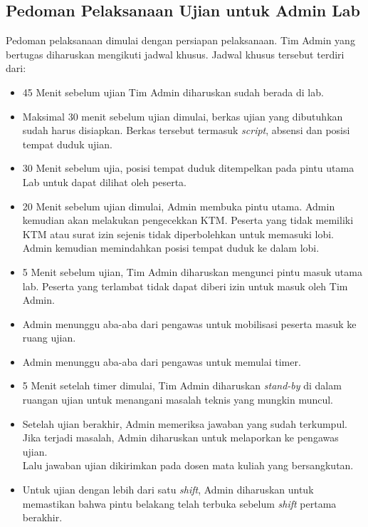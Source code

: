 \subsection{Pedoman Pelaksanaan Ujian untuk Admin Lab}
    Pedoman pelaksanaan dimulai dengan persiapan pelaksanaan. Tim Admin yang
    bertugas diharuskan mengikuti jadwal khusus. Jadwal khusus tersebut terdiri
    dari:
    \begin{itemize}
        \item 45 Menit sebelum ujian Tim Admin diharuskan sudah berada di lab.
        \item Maksimal 30 menit sebelum ujian dimulai, berkas ujian yang
            dibutuhkan sudah harus disiapkan. Berkas tersebut termasuk
            \textit{script}, absensi dan posisi tempat duduk ujian. 
        \item 30 Menit sebelum ujia, posisi tempat duduk ditempelkan pada pintu
            utama Lab untuk dapat dilihat oleh peserta.
        \item 20 Menit sebelum ujian dimulai, Admin membuka pintu utama. Admin
            kemudian akan melakukan pengecekkan KTM. Peserta yang tidak memiliki
            KTM atau surat izin sejenis tidak diperbolehkan untuk memasuki
            lobi. \\
            Admin kemudian memindahkan posisi tempat duduk ke dalam lobi.
        \item 5 Menit sebelum ujian, Tim Admin diharuskan mengunci pintu masuk
            utama lab. Peserta yang terlambat tidak dapat diberi izin untuk
            masuk oleh Tim Admin.
        \item Admin menunggu aba-aba dari pengawas untuk mobilisasi peserta
            masuk ke ruang ujian.
        \item Admin menunggu aba-aba dari pengawas untuk memulai timer.
        \item 5 Menit setelah timer dimulai, Tim Admin diharuskan
            \textit{stand-by} di dalam ruangan ujian untuk menangani masalah
            teknis yang mungkin muncul.
        \item Setelah ujian berakhir, Admin memeriksa jawaban yang sudah
            terkumpul. Jika terjadi masalah, Admin diharuskan untuk melaporkan
            ke pengawas ujian. \\
        Lalu jawaban ujian dikirimkan pada dosen mata kuliah yang bersangkutan.
        \item Untuk ujian dengan lebih dari satu \textit{shift}, Admin
            diharuskan untuk memastikan bahwa pintu belakang telah terbuka
            sebelum \textit{shift} pertama berakhir.
    \end{itemize}

